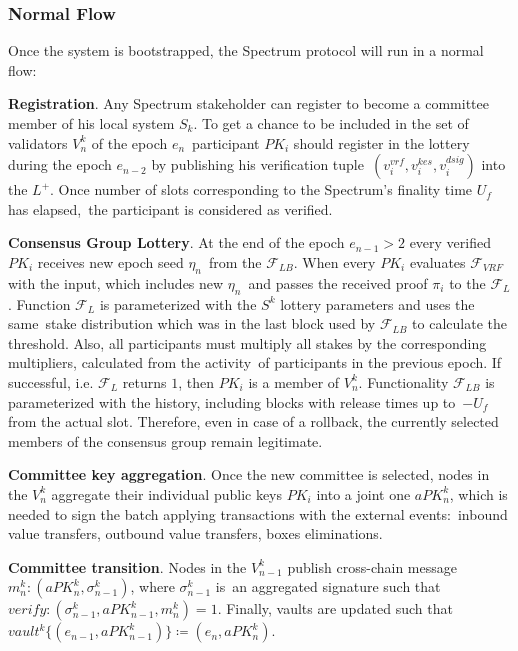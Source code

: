 \subsubsection{Normal Flow}\label{subsubsec:normal-flow}
Once the system is bootstrapped, the Spectrum protocol will run in a normal flow:
\begin{legal}
    \item \textbf{Registration}.
    Any Spectrum stakeholder can register to become a committee member of his local system $S_k$.
    To get a chance to be included in the set of validators $V^k_n$ of the epoch $e_n$\
    participant $PK_i$ should register in the lottery during the epoch $e_{n-2}$ by publishing his verification tuple\
    ${(v_i^{vrf}, v_i^{kes}, v_i^{dsig})}$ into the $L^+$.
    Once number of slots corresponding to the Spectrum's finality time $U_f$ has elapsed,\
    the participant is considered as verified.

    \item \textbf{Consensus Group Lottery}.
    At the end of the epoch ${e_{n-1} \gt 2}$ every verified $PK_i$ receives new epoch seed $\eta_n$\
    from the ${\mathcal{F}}_{LB}$.
    When every $PK_i$ evaluates ${\mathcal{F}}_{VRF}$ with the input, which includes new $\eta_n$\
    and passes the received proof $\pi_i$ to the ${\mathcal{F}}_{L}$.
    Function ${\mathcal{F}}_{L}$ is parameterized with the $S^k$ lottery parameters and uses the same\
    stake distribution which was in the last block used by ${\mathcal{F}}_{LB}$ to calculate the threshold.
    Also, all participants must multiply all stakes by the corresponding multipliers, calculated from the activity\
    of participants in the previous epoch.
    If successful, i.e. ${\mathcal{F}}_{L}$ returns $1$, then $PK_i$ is a member of $V^k_n$.
    Functionality ${\mathcal{F}}_{LB}$ is parameterized with the history, including blocks with release times up to\
    ${-U_f}$ from the actual slot.
    Therefore, even in case of a rollback, the currently selected members of the consensus group remain legitimate.

    \item \textbf{Committee key aggregation}.
    Once the new committee is selected, nodes in the $V^k_n$ aggregate their individual public keys $PK_i$ into
    a joint one $aPK^k_n$, which is needed to sign the batch applying transactions with the external events:\
    inbound value transfers, outbound value transfers, boxes eliminations.

    \item \textbf{Committee transition}.
    Nodes in the $V^k_{n - 1}$ publish cross-chain message ${m^k_n : (aPK^k_n, \sigma^k_{n-1})}$, where $\sigma^k_{n-1}$ is\
    an aggregated signature such that ${verify: (\sigma^k_{n-1}, aPK^k_{n-1}, m^k_n) = 1}$.
    Finally, vaults are updated such that ${vault^k\{(e_{n-1}, aPK^k_{n-1})\} \coloneqq(e_n, aPK^k_n)}$.


\end{legal}
